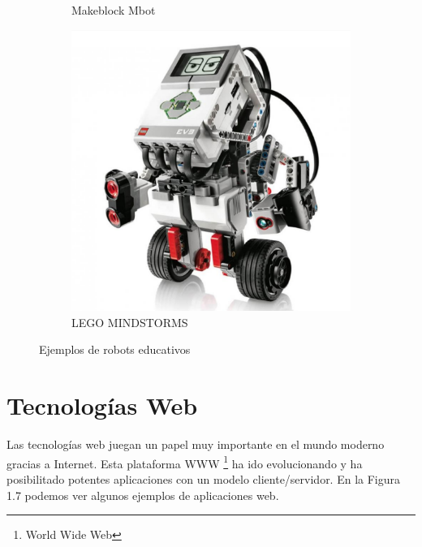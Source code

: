 \begin{figure}[H]
\begin{subfigure}{.3\linewidth}
        \caption{Makeblock Mbot}
    \end{subfigure}
    \begin{subfigure}{.3\linewidth}
       \includegraphics[width=1\textwidth]{chapters/images/lego.png}
        \caption{LEGO MINDSTORMS}
    \end{subfigure}
    \caption{Ejemplos de robots educativos}
\end{figure}


\newpage
\section{Tecnologías Web}
Las tecnologías web juegan un papel muy importante en el mundo moderno gracias a Internet. Esta plataforma WWW \footnote{World Wide Web} \cite{www}
ha ido evolucionando y ha posibilitado potentes aplicaciones con un modelo cliente/servidor. En la Figura 1.7 podemos ver algunos ejemplos de aplicaciones web.

